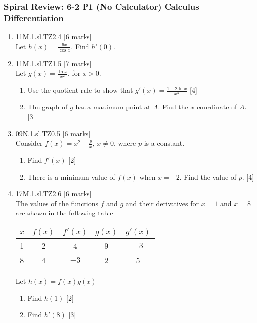 \documentclass[12pt, twoside]{article}
\begin{document}
\subsubsection*{Spiral Review: 6-2 P1 (No Calculator) Calculus Differentiation}
 \begin{enumerate}

  \item 11M.1.sl.TZ2.4 \hfill [6 marks]\\
  Let $h(x)= \frac{6x}{\cos x}$. Find $h'(0)$.

  \item 11M.1.sl.TZ1.5 \hfill [7 marks]\\
  Let $g(x)= \frac{\ln x}{x^2}$, for $x>0$.
  \begin{enumerate}
    \item Use the quotient rule to show that $g'(x)= \frac{1-2\ln x}{x^3}$
    \hfill [4]
    \item The graph of $g$ has a maximum point at $A$. Find the $x$-coordinate of $A$. \hfill [3]
  \end{enumerate}

  \item 09N.1.sl.TZ0.5 \hfill [6 marks]\\
  Consider $f(x)= x^2+\frac{p}{x}$, $x \neq 0$, where $p$ is a constant.
  \begin{enumerate}
    \item Find $f'(x)$ \hfill [2]
    \item There is a minimum value of $f(x)$ when $x=-2$. Find the value of $p$. \hfill [4]
  \end{enumerate}

  \item 17M.1.sl.TZ2.6 \hfill [6 marks]\\
  The values of the functions $f$ and $g$ and their derivatives for $x=1$ and $x=8$ are shown in the following table.
  \begin{center}
    \begin{tabular}{|c|c|c|c|c|}
      \hline
      $x$ & $f(x)$ & $f'(x)$ & $g(x)$ & $g'(x)$ \\
      \hline
      1 & 2 & 4 & 9 & $-3$ \\
      \hline
      8 & 4 & $-3$ & 2 & 5 \\
      \hline
    \end{tabular}
  \end{center}
  Let $h(x)=f(x)g(x)$
  \begin{enumerate}
    \item Find $h(1)$ \hfill [2]
    \item Find $h'(8)$ \hfill [3]
  \end{enumerate}


\end{enumerate}
\end{document}
